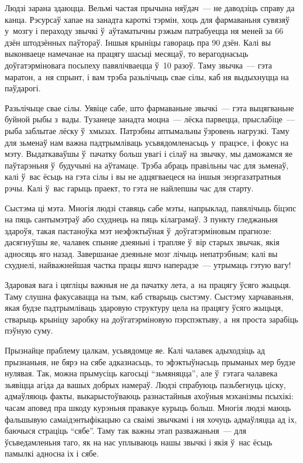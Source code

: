 Людзі зарана здаюцца. Вельмі частая прычына няўдач~--- не даводзіць справу да канца. Рэсурсаў хапае на занадта кароткі тэрмін, хоць для фармаваньня сувязяў у~мозгу і пераходу звычкі ў~аўтаматычны рэжым патрабуецца ня меней за 66 дзён штодзённых паўтораў. Іншыя крыніцы гавораць пра 90 дзён. Калі вы выконваеце намечанае на працягу шасьці месяцаў, то верагоднасьць доўгатэрміновага посьпеху павялічваецца ў~10 разоў. Таму звычка~--- гэта маратон, а~ня спрынт, і вам трэба разьлічыць свае сілы, каб ня выдыхнуцца на паўдарогі.

Разьлічыце свае сілы. Уявіце сабе, што фармаваньне звычкі~--- гэта выцягваньне буйной рыбы з~вады. Тузанеце занадта моцна~--- лёска парвецца, прыслабіце~--- рыба заблытае лёску ў~хмызах. Патрэбны аптымальны ўзровень нагрузкі. Таму для зьменаў нам важна падтрымліваць усьвядомленасьць у~працэсе, і фокус на мэту. Выдаткаваўшы ў~пачатку больш увагі і сілаў на звычку, мы даможамся яе паўтарэньня ў~будучыні на аўтамаце. Трэба абраць правільны час для зьменаў, калі ў~вас ёсьць на гэта сілы і вы не адцягваецеся на іншыя энэргазатратныя рэчы. Калі ў~вас гарыць праект, то гэта не найлепшы час для старту.

Сыстэма ці мэта. Многія людзі ставяць сабе мэты, напрыклад, павялічыць біцэпс на пяць сантымэтраў або схуднець на пяць кілаграмаў. З пункту гледжаньня здароўя, такая пастаноўка мэт неэфэктыўная ў~доўгатэрміновым прагнозе: дасягнуўшы яе, чалавек спыняе дзеяньні і трапляе ў~вір старых звычак, якія адносяць яго назад. Завершанае дзеяньне мозг лічыць непатрэбным; калі вы схуднелі, найважнейшая частка працы яшчэ наперадзе~--- утрымаць гэтую вагу! 

Здаровая вага і цягліцы важныя не да пачатку лета, а~на працягу ўсяго жыцьця. Таму слушна факусавацца на тым, каб стварыць сыстэму. Сыстэму харчаваньня, якая будзе падтрымліваць здаровую структуру цела на працягу ўсяго жыцьця, стварыць крыніцу заробку на доўгатэрміновую пэрспэктыву, а~ня проста зарабіць пэўную суму.

Прызнайце праблему цалкам, усьвядомце яе. Калі чалавек адыходзіць ад прызнаньня, не бярэ на сябе адказнасьць, то эфэктыўнасьць прыманых мер будзе нулявая. Так, можна прымусіць кагосьці ``зьмяняцца'', але ў~гэтага чалавека зьявіцца агіда да вашых добрых намераў. Людзі спрабуюць пазьбегнуць ціску, адмаўляюць факты, выкарыстоўваюць разнастайныя ахоўныя мэханізмы псыхікі: часам аповед пра шкоду курэньня правакуе курыць больш. Многія людзі маюць фальшывую самаідэнтыфікацыю са сваімі звычкамі і ня хочуць адмаўляцца ад іх, баючыся страціць ``сябе''. Таму так важны этап разважаньня~--- для ўсьведамленьня таго, як на нас уплываюць нашы звычкі і якія ў~нас ёсьць памылкі адносна іх і сябе.

